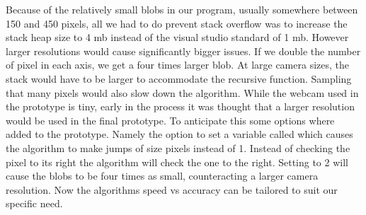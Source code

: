 Because of the relatively small blobs in our program, usually somewhere between 150 and 450 pixels, all we had to do prevent stack overflow was to increase the stack heap size to 4 mb instead of the visual studio standard of 1 mb. However larger resolutions would cause significantly bigger issues. If we double the number of pixel in each axis, we get a four times larger blob. At large camera sizes, the stack would have to be larger to accommodate the recursive function. Sampling that many pixels would also slow down the algorithm. While the webcam used in the prototype is tiny, early in the process it was thought that a larger resolution would be used in the final prototype. To anticipate this some options where added to the prototype. Namely the option to set a variable called  which causes the algorithm to make jumps of size  pixels instead of 1. Instead of checking the pixel to its right the algorithm will check the one  to the right. Setting  to 2 will cause the blobs to be four times as small, counteracting a larger camera resolution. Now the algorithms speed vs accuracy can be tailored to suit our specific need.
